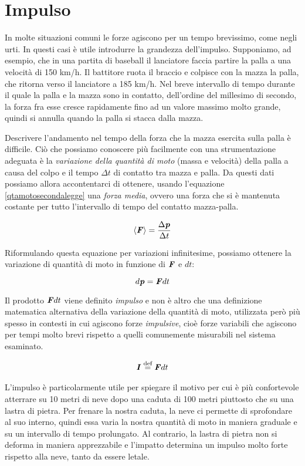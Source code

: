 \section{Impulso}
In molte situazioni comuni le forze agiscono per un tempo brevissimo, come
negli urti. In questi casi è utile introdurre la grandezza dell'impulso.
Supponiamo, ad esempio, che in una partita di baseball il lanciatore faccia
partire la palla a una velocità di 150 km/h. Il battitore ruota il braccio
e colpisce con la mazza la palla, che ritorna verso il lanciatore a 185 km/h.
Nel breve intervallo di tempo durante il quale la palla e la mazza sono in
contatto, dell'ordine del millesimo di secondo, la forza fra esse cresce
rapidamente fino ad un valore massimo molto grande, quindi si annulla quando
la palla si stacca dalla mazza.

Descrivere l'andamento nel tempo della forza che la mazza esercita sulla palla è
difficile. Ciò che possiamo conoscere più facilmente con una strumentazione
adeguata è la \textit{variazione della quantità di moto} (massa e velocità) della
palla a causa del colpo e il tempo $\Delta t$ di contatto tra mazza e palla. Da questi
dati possiamo allora accontentarci di ottenere, usando l'equazione \ref{qtamotosecondalegge} una \textit{forza media}, ovvero
una forza che si è mantenuta costante per tutto l'intervallo di tempo del contatto
mazza-palla.

\[ \left\langle \textbf{\textit{F}}\right\rangle  = \frac{\Delta\textbf{\textit{p}}}{\Delta t} \]

\noindent Riformulando questa equazione per variazioni infinitesime, possiamo
ottenere la variazione di quantità di moto in funzione di $\textbf{\textit{F}}$ e $dt$:

\[ d\textbf{\textit{p}} = \textbf{\textit{F}}dt \]

\noindent Il prodotto $\textbf{\textit{F}}dt$ viene definito \textit{impulso} e non è
altro che una definizione matematica alternativa della variazione della quantità
di moto, utilizzata però più spesso in contesti in cui agiscono forze \textit{impulsive},
cioè forze variabili che agiscono per tempi molto brevi rispetto a quelli
comunemente misurabili nel sistema esaminato.

\begin{align}
    \textbf{\textit{I}} \stackrel{\text{def}}{=} \textbf{\textit{F}}dt
\end{align}

\noindent L'impulso è particolarmente utile per spiegare il motivo per cui
è più confortevole atterrare su 10 metri di neve dopo una caduta di 100 metri
piuttosto che su una lastra di pietra. Per frenare la nostra caduta, la neve
ci permette di sprofondare al suo interno, quindi essa varia la nostra quantità
di moto in maniera graduale e su un intervallo di tempo prolungato. Al contrario,
la lastra di pietra non si deforma in maniera apprezzabile e l'impatto determina
un impulso molto forte rispetto alla neve, tanto da essere letale.


